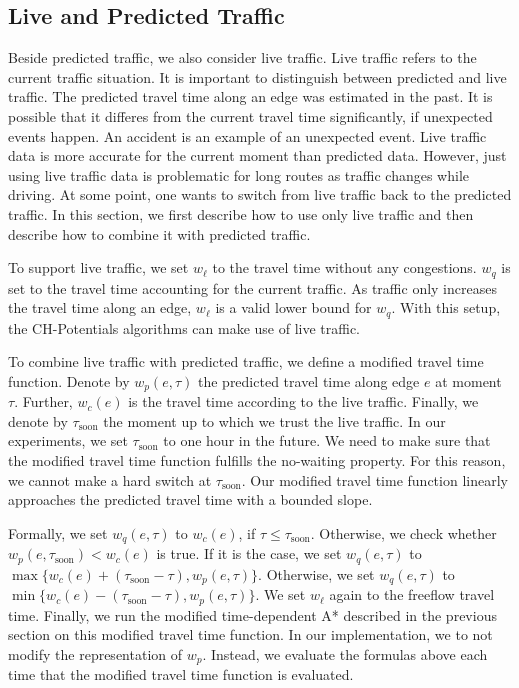 \documentclass[letterpaper]{article} %
\begin{document}
\subsection{Live and Predicted Traffic}
\label{sec:live-predicted-traffic}

Beside predicted traffic, we also consider live traffic.
Live traffic refers to the current traffic situation.
It is important to distinguish between predicted and live traffic.
The predicted travel time along an edge was estimated in the past.
It is possible that it differes from the current travel time significantly, if unexpected events happen.
An accident is an example of an unexpected event.
Live traffic data is more accurate for the current moment than predicted data.
However, just using live traffic data is problematic for long routes as traffic changes while driving.
At some point, one wants to switch from live traffic back to the predicted traffic.
In this section, we first describe how to use only live traffic and then describe how to combine it with predicted traffic.

To support live traffic, we set $w_\ell$ to the travel time without any congestions.
$w_q$ is set to the travel time accounting for the current traffic.
As traffic only increases the travel time along an edge, $w_\ell$ is a valid lower bound for $w_q$.
With this setup, the CH-Potentials algorithms can make use of live traffic.

To combine live traffic with predicted traffic, we define a modified travel time function.
Denote by $w_p(e,\tau)$ the predicted travel time along edge $e$ at moment $\tau$.
Further, $w_c(e)$ is the travel time according to the live traffic.
Finally, we denote by $\tau_{\mathrm{soon}}$ the moment up to which we trust the live traffic.
In our experiments, we set $\tau_{\mathrm{soon}}$ to one hour in the future.
We need to make sure that the modified travel time function fulfills the no-waiting property.
For this reason, we cannot make a hard switch at $\tau_{\mathrm{soon}}$.
Our modified travel time function linearly approaches the predicted travel time with a bounded slope.

Formally, we set $w_q(e,\tau)$ to $w_c(e)$, if $\tau \leq \tau_{\mathrm{soon}}$.
Otherwise, we check whether $w_p(e,\tau_{\mathrm{soon}}) < w_c(e)$ is true.
If it is the case, we set $w_q(e,\tau)$ to $\max\{w_c(e)+(\tau_{\mathrm{soon}}-\tau), w_p(e,\tau)\}$.
Otherwise, we set $w_q(e,\tau)$ to $\min\{w_c(e)-(\tau_{\mathrm{soon}}-\tau), w_p(e,\tau)\}$.
We set $w_\ell$ again to the freeflow travel time.
Finally, we run the modified time-dependent A* described in the previous section on this modified travel time function.
In our implementation, we to not modify the representation of $w_p$.
Instead, we evaluate the formulas above each time that the modified travel time function is evaluated.
\end{document}

